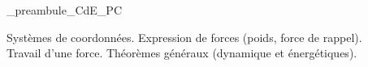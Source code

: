 



\ifdefined\mainIsLoaded\else
\RequirePackage{import}
{_preambule_CdE_PC}

\fi







\debutFicheEntrainement                                                                      %




\begin{prerequis}
Systèmes de coordonnées. Expression de forces (poids, force de rappel). \\
Travail d'une force. Théorèmes généraux (dynamique et énergétiques).	
\end{prerequis}






